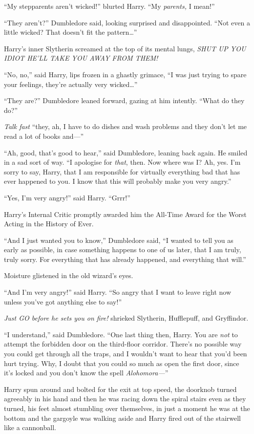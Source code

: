 “My stepparents aren’t wicked!” blurted Harry. “My \emph{parents,} I mean!”

“They aren’t?” Dumbledore said, looking surprised and disappointed. “Not even a little wicked? That doesn’t fit the pattern…”

Harry’s inner Slytherin screamed at the top of its mental lungs, \emph{SHUT UP YOU IDIOT HE’LL TAKE YOU AWAY FROM THEM!}

“No, no,” said Harry, lips frozen in a ghastly grimace, “I was just trying to spare your feelings, they’re actually very wicked…”

“They are?” Dumbledore leaned forward, gazing at him intently. “What do they do?”

\emph{Talk fast} “they, ah, I have to do dishes and wash problems and they don’t let me read a lot of books and—”

“Ah, good, that’s good to hear,” said Dumbledore, leaning back again. He smiled in a sad sort of way. “I apologise for \emph{that}, then. Now where was I? Ah, yes. I’m sorry to say, Harry, that I am responsible for virtually everything bad that has ever happened to you. I know that this will probably make you very angry.”

“Yes, I’m very angry!” said Harry. “Grrr!”

Harry’s Internal Critic promptly awarded him the All-Time Award for the Worst Acting in the History of Ever.

“And I just wanted you to know,” Dumbledore said, “I wanted to tell you as early as possible, in case something happens to one of us later, that I am truly, truly sorry. For everything that has already happened, and everything that will.”

Moisture glistened in the old wizard’s eyes.

“And I’m very angry!” said Harry. “So angry that I want to leave right now unless you’ve got anything else to say!”

\emph{Just GO before he sets you on fire!} shrieked Slytherin, Hufflepuff, and Gryffindor.

“I understand,” said Dumbledore. “One last thing then, Harry. You are \emph{not} to attempt the forbidden door on the third-floor corridor. There’s no possible way you could get through all the traps, and I wouldn’t want to hear that you’d been hurt trying. Why, I doubt that you could so much as open the first door, since it’s locked and you don’t know the spell \emph{Alohomora—}”

Harry spun around and bolted for the exit at top speed, the doorknob turned agreeably in his hand and then he was racing down the spiral stairs even as they turned, his feet almost stumbling over themselves, in just a moment he was at the bottom and the gargoyle was walking aside and Harry fired out of the stairwell like a cannonball.

